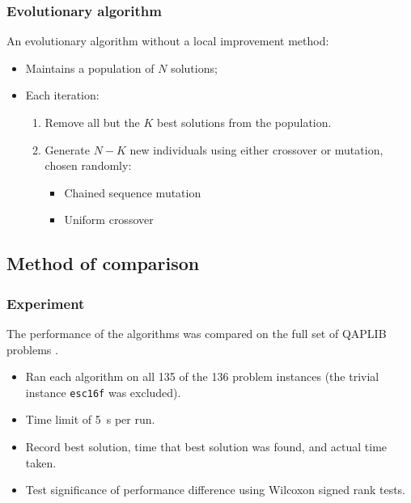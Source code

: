 {    \subsubsection{Evolutionary algorithm} {
        An evolutionary algorithm without a local improvement method:
        \begin{itemize}
            \item Maintains a population of \(N\) solutions;
            \item Each iteration:
            \begin{enumerate}
                \item Remove all but the \(K\) best solutions from the population.
                \item Generate \(N-K\) new individuals using either crossover or mutation, chosen randomly:
                    \begin{itemize}
                        \item Chained sequence mutation
                        \item Uniform crossover
                    \end{itemize}
            \end{enumerate}
        \end{itemize}
    }
}

\subsection{Method of comparison} {
    \subsubsection{Experiment} {
        The performance of the algorithms was compared on the full set of QAPLIB problems \citep{Burkard:1997ve}.

        \begin{itemize}
            \item Ran each algorithm on all 135 of the 136 problem instances (the trivial instance \texttt{esc16f} was excluded).
            \item Time limit of \SI{5}{\second} per run.
            \item Record best solution, time that best solution was found, and actual time taken.
            \item Test significance of performance difference using Wilcoxon signed rank tests.
        \end{itemize}
    }
}
